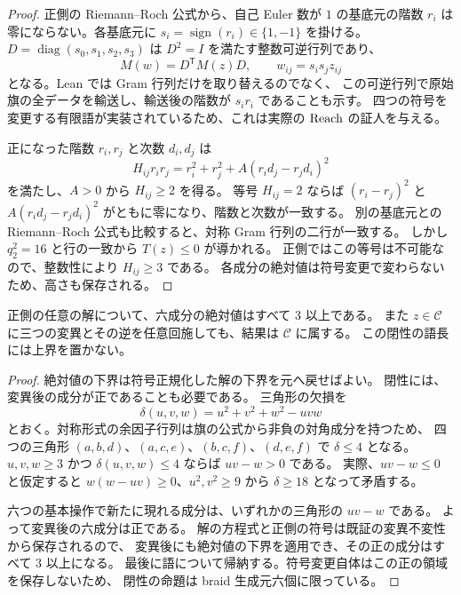 \begin{proof}
\leanok
正側の Riemann--Roch 公式から、自己 Euler 数が $1$ の基底元の階数 $r_i$ は
零にならない。各基底元に $s_i=\operatorname{sign}(r_i)\in\{1,-1\}$ を掛ける。
$D=\operatorname{diag}(s_0,s_1,s_2,s_3)$ は $D^2=I$ を満たす整数可逆行列であり、
\[
 M(w)=D^{\mathsf T}M(z)D,\qquad
 w_{ij}=s_i s_j z_{ij}
\]
となる。Lean では Gram 行列だけを取り替えるのでなく、
この可逆行列で原始旗の全データを輸送し、輸送後の階数が $s_i r_i$ であることも示す。
四つの符号を変更する有限語が実装されているため、これは実際の $\operatorname{Reach}$ の証人を与える。

正になった階数 $r_i,r_j$ と次数 $d_i,d_j$ は
\[
 H_{ij}r_i r_j=r_i^2+r_j^2+A(r_i d_j-r_j d_i)^2
\]
を満たし、$A>0$ から $H_{ij}\geq2$ を得る。
等号 $H_{ij}=2$ ならば $(r_i-r_j)^2$ と
$A(r_i d_j-r_j d_i)^2$ がともに零になり、階数と次数が一致する。
別の基底元との Riemann--Roch 公式も比較すると、対称 Gram 行列の二行が一致する。
しかし $q_2^2=16$ と行の一致から $T(z)\leq0$ が導かれる。
正側ではこの等号は不可能なので、整数性により $H_{ij}\geq3$ である。
各成分の絶対値は符号変更で変わらないため、高さも保存される。
\end{proof}

\begin{proposition}
\label{bp:pos-closure}
\leanok
正側の任意の解について、六成分の絶対値はすべて $3$ 以上である。
また $z\in\mathcal C$ に三つの変異とその逆を任意回施しても、結果は $\mathcal C$ に属する。
この閉性の語長には上界を置かない。
\end{proposition}

\begin{proof}
\leanok
絶対値の下界は符号正規化した解の下界を元へ戻せばよい。
閉性には、変異後の成分が正であることも必要である。
三角形の欠損を
\[
 \delta(u,v,w)=u^2+v^2+w^2-uvw
\]
とおく。対称形式の余因子行列は旗の公式から非負の対角成分を持つため、
四つの三角形 $(a,b,d)$、$(a,c,e)$、$(b,c,f)$、$(d,e,f)$ で $\delta\leq4$ となる。
$u,v,w\geq3$ かつ $\delta(u,v,w)\leq4$ ならば $uv-w>0$ である。
実際、$uv-w\leq0$ と仮定すると
$w(w-uv)\geq0$、$u^2,v^2\geq9$ から $\delta\geq18$ となって矛盾する。

六つの基本操作で新たに現れる成分は、いずれかの三角形の $uv-w$ である。
よって変異後の六成分は正である。
解の方程式と正側の符号は既証の変異不変性から保存されるので、
変異後にも絶対値の下界を適用でき、その正の成分はすべて $3$ 以上になる。
最後に語について帰納する。符号変更自体はこの正の領域を保存しないため、
閉性の命題は braid 生成元六個に限っている。
\end{proof}

